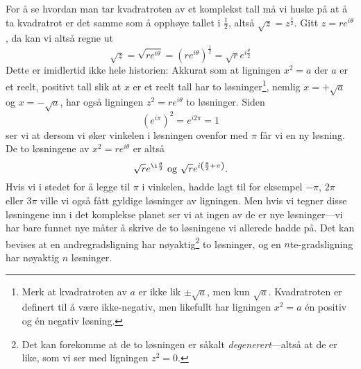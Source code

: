 \documentclass[a4paper,norsk,12pt]{article}
\begin{document}
For å se hvordan man tar kvadratroten av et komplekst tall må vi huske på at å ta kvadratrot er det samme som å opphøye tallet i $\frac12$, altså $\sqrt{z} = z^\frac12$. Gitt $z = re^{i\theta}$, da kan vi altså regne ut
\begin{displaymath}
	\sqrt{z} = \sqrt{re^{i\theta}} = \left(re^{i\theta}\right)^\frac12 = \sqrt{r}e^{i\frac{\theta}{2}}
\end{displaymath}
Dette er imidlertid ikke hele historien: Akkurat som at ligningen $x^2=a$ der $a$ er et reelt, positivt tall slik at $x$ er et reelt tall har to løsninger\footnote{Merk at kvadratroten av $a$ er ikke lik $\pm\sqrt{a}$, men kun $\sqrt{a}$. Kvadratroten er definert til å være ikke-negativ, men likefullt har ligningen $x^2=a$ \'en positiv og \'en negativ løsning.}, nemlig $x=+\sqrt{a}$ og $x =-\sqrt{a}$, har også ligningen $z^2=re^{i\theta}$ to løsninger. Siden 
\begin{displaymath}
	(e^{i\pi})^2 = e^{i2\pi} = 1
\end{displaymath}
ser vi at dersom vi øker vinkelen i løsningen ovenfor med $\pi$ får vi en ny løsning. De to løsningene av $x^2 = re^{i\theta}$ er altså
\begin{displaymath}
	\sqrt{r}e^{\i\frac{\theta}{2}} \text{ og } \sqrt{r}e^{i\left(\frac{\theta}{2} + \pi\right)}.
\end{displaymath}
Hvis vi i stedet for å legge til $\pi$ i vinkelen, hadde lagt til for eksempel $-\pi$, $2\pi$ eller $3\pi$ ville vi også fått gyldige løsninger av ligningen. Men hvis vi tegner disse løsningene inn i det komplekse planet ser vi at ingen av de er nye løsninger---vi har bare funnet nye måter å skrive de to løsningene vi allerede hadde på. Det kan bevises at en andregradsligning har nøyaktig\footnote{Det kan forekomme at de to løsningen er såkalt \emph{degenerert}---altså at de er like, som vi ser med ligningen $z^2=0$.} to løsninger, og en $n$te-gradsligning har nøyaktig $n$ løsninger.
\end{document}
